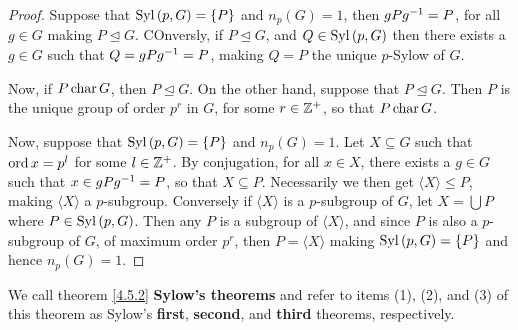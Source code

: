 \begin{proof}
  Suppose that $\operatorname{Syl}{(p,G)}=\{P\}$ and $n_p(G)=1$, then $gPg^{-1}=P$, for
  all $g \in G$ making $P \unlhd G$. COnversly, if $P \unlhd G$, and  $Q \in
  \operatorname{Syl}{(p,G)}$ then there exists a $g \in G$ such that  $Q=gPg^{-1}=P$, making
  $Q=P$ the unique $p$-Sylow of $G$.

  Now, if  $P \operatorname{char} G$, then  $P \unlhd G$. On the other hand, suppose that
  $P \unlhd G$. Then  $P$ is the unique group of order $p^r$ in $G$, for some
  $r \in \mathbb{Z}^+$, so that  $P \operatorname{char} G$.

  Now, suppose that $\operatorname{Syl}{(p,G)}=\{P\}$ and $n_p(G)=1$. Let $X \subseteq G$
  such that $\operatorname{ord}{x}=p^l$ for some $l \in \mathbb{Z}^+$. By conjugation, for all  $x
  \in X$, there exists a  $g \in G$ such that  $x \in gPg^{-1}=P$, so that
  $X \subseteq P$. Necessarily we then get  $\langle X \rangle \leq P$,
  making $\langle X \rangle$ a $p$-subgroup. Conversely if  $\langle X
  \rangle$ is a $p$-subgroup of $G$, let $X=\bigcup{P}$ where $P \in
  \operatorname{Syl}{(p,G)}$. Then any $P$ is a subgroup of  $\langle X \rangle$, and since
  $P$ is also a $p$-subgroup of  $G$, of maximum order $p^r$, then
  $P=\langle X \rangle$ making $\operatorname{Syl}{(p,G)}=\{P\}$ and hence $n_p(G)=1$.
\end{proof}

\begin{remark}
  We call theorem \ref{4.5.2} \textbf{Sylow's theorems} and refer to items
  (1), (2), and (3) of this theorem as Sylow's \textbf{first},
  \textbf{second}, and \textbf{third} theorems, respectively.
\end{remark}

